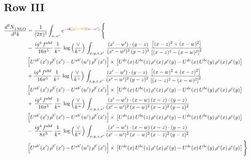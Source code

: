 \documentclass[9pt]{article}
\numberwithin{equation}{section}
\begin{document}
\subsection{Row III}
\begin{align}
   \frac{d^{3}N_{1\,\rm NLO}^{\rm}}{d^{3}k}  & =  \frac{1}{(2\pi)^{3}}  \int_{w, w^\prime} e^{-ik{\color{orange}\cancel{(w^\prime-w)}}{\color{red}(w-w^\prime)}}\, \Bigg\{\notag \\
& -\,\frac{ig^{4}\,f^{abd}}{16\pi^{5}}\,\frac{1}{k^{+}}\,\log{\left(\frac{\vee}{k^{+}}\right)}\,\int_{x,y,z,x'}\, \frac{(x'-w')\cdot (y-z)}{(x'-w')^{2}\,(y-z)^{2}}\,\frac{\left[(x-z)^{2}+(x-w)^{2}\right]}{\left[(x-z)^{2}-(x-w)^{2}\right]^{2}}\notag \\ & \left[U^{ab'}(x')\,\rho^{b'}(x')-U^{ab'}(w')\, \rho^{b'}(x')\right]\times\, \left[U^{de}(x)\,U^{bc}(z)\, \rho^{e}(x)\,\rho^{c}(y)-U^{de}(x)\,U^{bc}(y)\,\rho^{e}(x)\,\rho^{c}(y)\right] \notag \\
&  +\frac{ig^{4}\,f^{abd}}{16\pi^{5}}\, \frac{1}{k^{+}}\,\log{\left(\frac{\vee}{k^{+}}\right)}\,\int_{x,y,z,x'}\, \frac{(x'-w')\cdot (y-z)}{(x'-w')^{2}\,(y-z)^{2}}\, \frac{\left[(x-w)^{2}+(x-z)^{2}\right]}{\left[(x-z)^{2}-(x-w)^{2}\right]^{2}}\notag \\ & \left[U^{ab'}(x')\,\rho^{b'}(x')-U^{ab'}(w')\, \rho^{b'}(x')\right]\times\, \left[U^{de}(x)\,U^{bc}(z)\, \rho^{e}(x)\,\rho^{c}(y)-U^{de}(x)\,U^{bc}(y)\,\rho^{e}(x)\,\rho^{c}(y)\right] \notag \\
& +\, \frac{ig^{4}\,f^{abd}}{16\pi^{5}}\,\frac{1}{k^{+}}\,\log{\left(\frac{\vee}{k^{+}}\right)}\,\int_{x,y,z,x'} \frac{(x'-w')\cdot (x-w)\, (x-z)\cdot (y-z)}{(x'-w')^{2}\, (x-w)^{2}\, (x-z)^{2}\, (y-z)^{2}}\, \notag \\ & \left[U^{ab'}(x')\,\rho^{b'}(x')-U^{ab'}(w')\, \rho^{b'}(x')\right]\times\, \left[U^{de}(x)\,U^{bc}(z)\, \rho^{e}(x)\,\rho^{c}(y)-U^{de}(x)\,U^{bc}(y)\,\rho^{e}(x)\,\rho^{c}(y)\right] \notag \\
&-\, \frac{ig^{4}\,f^{abd}}{8\pi^{5}}\,\frac{1}{k^{+}}\,\log{\left(\frac{\vee}{k^{+}}\right)}\,\int_{x,y,z,x'}\frac{(x'-w')\cdot (x-w)\, (x-z)\cdot (y-z)}{(x'-w')^{2}\, (x-w)^{2}\, (x-z)^{2}\, (y-z)^{2}} \notag \\ & \left[U^{ab'}(x')\,\rho^{b'}(x')-U^{ab'}(w')\, \rho^{b'}(x')\right]\times\, \left[U^{de}(x)\,U^{bc}(z)\, \rho^{e}(x)\,\rho^{c}(y)-U^{de}(x)\,U^{bc}(y)\,\rho^{e}(x)\,\rho^{c}(y)\right]\Bigg\}
\end{align}
\end{document}
